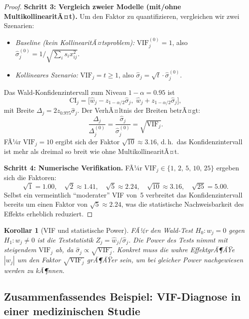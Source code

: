 ﻿\documentclass[12pt, a4paper]{article}
\newtheorem{corollary}[theorem]{Korollar}
\theoremstyle{definition}
\theoremstyle{remark}
\begin{document}
\begin{proof}
	\textbf{Schritt 3: Vergleich zweier Modelle (mit/ohne MultikollinearitÃ¤t).}
	Um den Faktor zu quantifizieren, vergleichen wir zwei Szenarien:
	\begin{itemize}
		\item \emph{Baseline (kein KollinearitÃ¤tsproblem):} $\mathrm{VIF}_j^{(0)} = 1$, also
		$\hat{\sigma}_j^{(0)} = 1/\sqrt{\sum_i s_i x_{ij}^2}$.
		\item \emph{Kollineares Szenario:} $\mathrm{VIF}_j = t \geq 1$, also
		$\hat{\sigma}_j = \sqrt{t}\cdot\hat{\sigma}_j^{(0)}$.
	\end{itemize}
	Das Wald-Konfidenzintervall zum Niveau $1-\alpha = 0.95$ ist
	\[
	\mathrm{CI}_j = \bigl[\hat{w}_j - z_{1-\alpha/2}\hat{\sigma}_j,\;
	\hat{w}_j + z_{1-\alpha/2}\hat{\sigma}_j\bigr],
	\]
	mit Breite $\Delta_j = 2z_{0.975}\hat{\sigma}_j$. Der VerhÃ¤ltnis der Breiten betrÃ¤gt:
	\[
	\frac{\Delta_j}{\Delta_j^{(0)}} = \frac{\hat{\sigma}_j}{\hat{\sigma}_j^{(0)}} = \sqrt{\mathrm{VIF}_j}.
	\]
	FÃ¼r $\mathrm{VIF}_j = 10$ ergibt sich der Faktor $\sqrt{10} \approx 3.16$, d.\,h.\ das
	Konfidenzintervall ist mehr als dreimal so breit wie ohne MultikollinearitÃ¤t.
	
	\textbf{Schritt 4: Numerische Verifikation.}
	FÃ¼r $\mathrm{VIF}_j \in \{1,\,2,\,5,\,10,\,25\}$ ergeben sich die Faktoren:
	\[
	\sqrt{1} = 1.00,\quad \sqrt{2} \approx 1.41,\quad \sqrt{5} \approx 2.24,\quad
	\sqrt{10} \approx 3.16,\quad \sqrt{25} = 5.00.
	\]
	Selbst ein vermeintlich ``moderater'' VIF von~5 verbreitet das Konfidenzintervall
	bereits um einen Faktor von $\sqrt{5} \approx 2.24$, was die statistische Nachweisbarkeit
	des Effekts erheblich reduziert.
\end{proof}

\begin{corollary}[VIF und statistische Power]
	FÃ¼r den Wald-Test $H_0: w_j = 0$ gegen $H_1: w_j \neq 0$ ist die Teststatistik
	$Z_j = \hat{w}_j / \hat{\sigma}_j$. Die Power des Tests nimmt mit steigendem $\mathrm{VIF}_j$
	ab, da $\hat{\sigma}_j \propto \sqrt{\mathrm{VIF}_j}$. Konkret muss die wahre EffektgrÃ¶ÃŸe
	$|w_j|$ um den Faktor $\sqrt{\mathrm{VIF}_j}$ grÃ¶ÃŸer sein, um bei gleicher Power
	nachgewiesen werden zu kÃ¶nnen.
\end{corollary}

\subsection{Zusammenfassendes Beispiel: VIF-Diagnose in einer medizinischen Studie}
\end{document}
